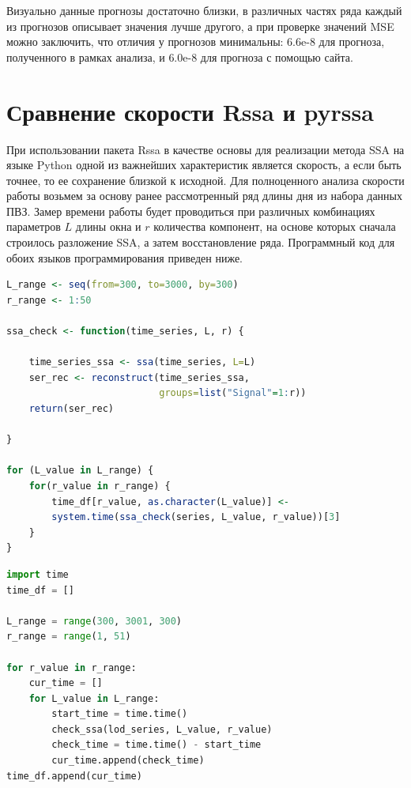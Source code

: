 \documentclass[specialist,
			   substylefile = spbu_report.rtx,
			   subf,href,colorlinks=true, 12pt]{disser}
\begin{document}
Визуально данные прогнозы достаточно близки, в различных частях ряда каждый из прогнозов описывает значения лучше другого, а при проверке значений MSE можно заключить, что отличия у прогнозов минимальны: $6.6\text{e-}8$ для прогноза, полученного в рамках анализа, и $6.0\text{e-}8$ для прогноза с помощью сайта.

\chapter{Сравнение скорости Rssa и pyrssa}
	
При использовании пакета Rssa в качестве основы для реализации метода SSA на языке Python одной из важнейших характеристик является скорость, а если быть точнее, то ее сохранение близкой к исходной. Для полноценного анализа скорости работы возьмем за основу ранее рассмотренный ряд длины дня из набора данных ПВЗ. Замер времени работы будет проводиться при различных комбинациях параметров $L$ длины окна и $r$ количества компонент, на основе которых сначала строилось разложение SSA, а затем восстановление ряда. Программный код для обоих языков программирования приведен ниже.

\begin{lstlisting}[language=R, caption=Программный код для анализа времени работы на языке R.]
L_range <- seq(from=300, to=3000, by=300)
r_range <- 1:50	

ssa_check <- function(time_series, L, r) {
	
	time_series_ssa <- ssa(time_series, L=L)
	ser_rec <- reconstruct(time_series_ssa,
	                       groups=list("Signal"=1:r))
	return(ser_rec)
	
}

for (L_value in L_range) {
	for(r_value in r_range) {
		time_df[r_value, as.character(L_value)] <- 
		system.time(ssa_check(series, L_value, r_value))[3]
	}
}
\end{lstlisting}

\begin{lstlisting}[language=Python, caption=Программный код для анализа времени работы на языке Python.]
import time
time_df = []

L_range = range(300, 3001, 300)
r_range = range(1, 51)

for r_value in r_range:
	cur_time = []
	for L_value in L_range:
		start_time = time.time()
		check_ssa(lod_series, L_value, r_value)
		check_time = time.time() - start_time
		cur_time.append(check_time)
time_df.append(cur_time)
\end{lstlisting}
\end{document}
